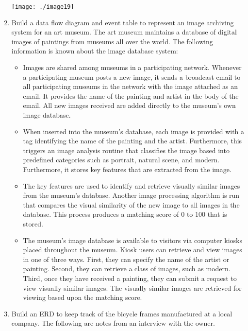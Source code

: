 \begin{enumerate}
\texttt{[image: ./image19]}


\item
  Build a data flow diagram and event table to represent an image
  archiving system for an art museum. The art museum maintains a
  database of digital images of paintings from museums all over the
  world. The following information is known about the image database
  system:

\begin{itemize}
\item
  Images are shared among museums in a participating network. Whenever a
  participating museum posts a new image, it sends a broadcast email to
  all participating museums in the network with the image attached as an
  email. It provides the name of the painting and artist in the body of
  the email. All new images received are added directly to the museum's
  own image database.
\item
  When inserted into the museum's database, each image is provided with
  a tag identifying the name of the painting and the artist.
  Furthermore, this triggers an image analysis routine that classifies
  the image based into predefined categories such as portrait, natural
  scene, and modern. Furthermore, it stores key features that are
  extracted from the image.
\item
  The key features are used to identify and retrieve visually similar
  images from the museum's database. Another image processing algorithm
  is run that compares the visual similarity of the new image to all
  images in the database. This process produces a matching score of 0 to
  100 that is stored.
\item
  The museum's image database is available to visitors via computer
  kiosks placed throughout the museum. Kiosk users can retrieve and view
  images in one of three ways. First, they can specify the name of the
  artist or painting. Second, they can retrieve a class of images, such
  as modern. Third, once they have received a painting, they can submit
  a request to view visually similar images. The visually similar images
  are retrieved for viewing based upon the matching score.
\end{itemize}

  \item
    Build an ERD to keep track of the bicycle frames manufactured at a
    local company. The following are notes from an interview with the
    owner.



\end{enumerate}

